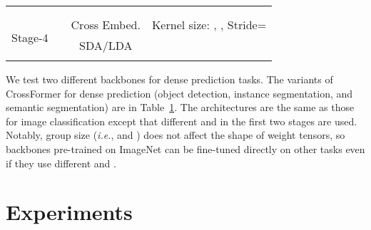 \documentclass{article} \usepackage{iclr2022_conference,times}
\newcommand{\ie}{{\emph{i.e.}}}
\begin{document}
\begin{table}[]
{{\begin{tabular}{cc|c|cccc}
                &  &  & & & & \\
                &  &  & & & & \\
                \midrule
                \multirow{5}{*}{Stage-4} & \multirow{5}{*}{} & Cross Embed. & \multicolumn{4}{c}{Kernel size: , , Stride=} \\ 
                \cmidrule{3-7}
                & & \multirow{3}{*}{SDA/LDA} & \multirow{3}{*}{} & \multirow{2}{*}{} & \multirow{2}{*}{} & \multirow{2}{*}{} \\
                &  & \multirow{3}{*}{MLP} &  &  &  \\ 
                &  &  & & & & \\
                &  &  & & & & \\
                \bottomrule
    \end{tabular}}}
    \label{tab:variants-2}
\end{table}
We test two different backbones for dense prediction tasks. The variants of CrossFormer for  dense prediction (object detection, instance segmentation, and semantic segmentation) are in Table~\ref{tab:variants-2}. The architectures are the same as those for image classification except that different  and  in the first two stages are used. Notably, group size (\ie,  and ) does not affect the shape of weight tensors, so backbones pre-trained on ImageNet can be fine-tuned directly on other tasks even if they use different  and .
    
\section{Experiments}
\end{document}
